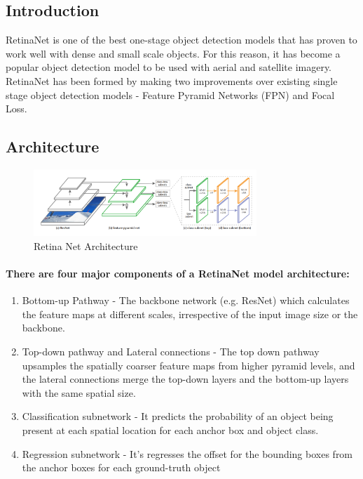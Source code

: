 \documentclass[12pt]{article}
\begin{document}
\subsection{Introduction}
RetinaNet is one of the best one-stage object detection models that has proven to work well with dense and small scale objects. For this reason, it has become a popular object detection model to be used with aerial and satellite imagery.
\\
RetinaNet has been formed by making two improvements over existing single stage object detection models - Feature Pyramid Networks (FPN) and Focal Loss.
\subsection{Architecture}
\begin{figure}[h]
    \centering
    \includegraphics[width=0.75\textwidth]{images/retina_arch.png}
    \caption{Retina Net Architecture}
    \label{fig:retina1}
\end{figure}

\paragraph{There are four major components of a RetinaNet model architecture:}

\begin{enumerate}[leftmargin=1cm, labelwidth=4cm]
  \item Bottom-up Pathway - The backbone network (e.g. ResNet) which calculates the feature maps at different scales, irrespective of the input image size or the backbone.
  \item Top-down pathway and Lateral connections - The top down pathway upsamples the spatially coarser feature maps from higher pyramid levels, and the lateral connections merge the top-down layers and the bottom-up layers with the same spatial size.
  \item Classification subnetwork - It predicts the probability of an object being present at each spatial location for each anchor box and object class.
  \item Regression subnetwork - It's regresses the offset for the bounding boxes from the anchor boxes for each ground-truth object
\end{enumerate}
\end{document}
